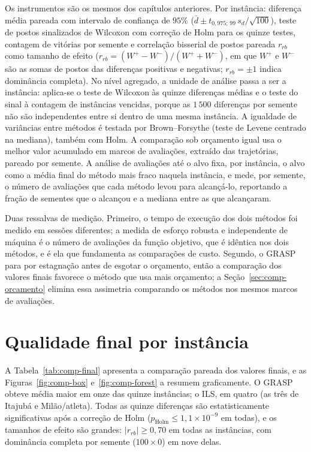 \documentclass[11pt,a4paper]{article}
\begin{document}
Os instrumentos são os mesmos dos capítulos anteriores. Por instância: diferença média pareada com intervalo de confiança de $95\%$ ($\bar{d} \pm t_{0{,}975;\,99}\, s_d/\sqrt{100}$), teste de postos sinalizados de Wilcoxon com correção de Holm para os quinze testes, contagem de vitórias por semente e correlação bisserial de postos pareada $r_{rb}$ como tamanho de efeito ($r_{rb} = (W^+ - W^-)/(W^+ + W^-)$, em que $W^+$ e $W^-$ são as somas de postos das diferenças positivas e negativas; $r_{rb} = \pm 1$ indica dominância completa). No nível agregado, a unidade de análise passa a ser a instância: aplica-se o teste de Wilcoxon às quinze diferenças médias e o teste do sinal à contagem de instâncias vencidas, porque as $1\,500$ diferenças por semente não são independentes entre si dentro de uma mesma instância. A igualdade de variâncias entre métodos é testada por Brown--Forsythe (teste de Levene centrado na mediana), também com Holm. A comparação sob orçamento igual usa o melhor valor acumulado em marcos de avaliações, extraído das trajetórias, pareado por semente. A análise de avaliações até o alvo fixa, por instância, o alvo como a média final do método mais fraco naquela instância, e mede, por semente, o número de avaliações que cada método levou para alcançá-lo, reportando a fração de sementes que o alcançou e a mediana entre as que alcançaram.

Duas ressalvas de medição. Primeiro, o tempo de execução dos dois métodos foi medido em sessões diferentes; a medida de esforço robusta e independente de máquina é o número de avaliações da função objetivo, que é idêntica nos dois métodos, e é ela que fundamenta as comparações de custo. Segundo, o GRASP para por estagnação antes de esgotar o orçamento, então a comparação dos valores finais favorece o método que usa mais orçamento; a Seção~\ref{sec:comp-orcamento} elimina essa assimetria comparando os métodos nos mesmos marcos de avaliações.

\section{Qualidade final por instância}
\label{sec:comp-final}

A Tabela~\ref{tab:comp-final} apresenta a comparação pareada dos valores finais, e as Figuras~\ref{fig:comp-box} e~\ref{fig:comp-forest} a resumem graficamente. O GRASP obteve média maior em onze das quinze instâncias; o ILS, em quatro (as três de Itajubá e Milão/atleta). Todas as quinze diferenças são estatisticamente significativas após a correção de Holm ($p_{\text{Holm}} \le 1{,}1 \times 10^{-9}$ em todas), e os tamanhos de efeito são grandes: $|r_{rb}| \ge 0{,}70$ em todas as instâncias, com dominância completa por semente ($100 \times 0$) em nove delas.
\end{document}
